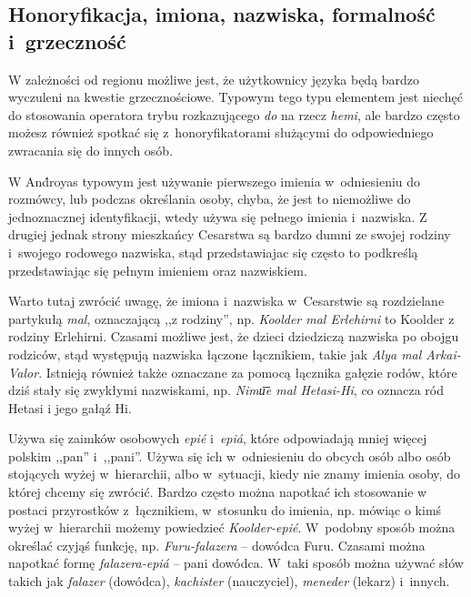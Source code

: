 \begin{spacing}{1.1}
\subsection{Honoryfikacja, imiona, nazwiska, formalność i~grzeczność}

W zależności od regionu możliwe jest, że użytkownicy języka będą bardzo
wyczuleni na kwestie grzecznościowe. Typowym tego typu elementem jest niechęć do
stosowania operatora trybu rozkazującego \emph{do} na rzecz \emph{hemi}, ale
bardzo często możesz również spotkać się z~honoryfikatorami służącymi do
odpowiedniego zwracania się do innych osób.

W And́royas typowym jest używanie pierwszego imienia w~odniesieniu do rozmówcy,
lub podczas określania osoby, chyba, że jest to niemożliwe do jednoznacznej
identyfikacji, wtedy używa się pełnego imienia i~nazwiska. Z drugiej jednak
strony mieszkańcy Cesarstwa są bardzo dumni ze swojej rodziny i~swojego rodowego
nazwiska, stąd przedstawiajac się często to podkreślą przedstawiając się pełnym
imieniem oraz nazwiskiem.


Warto tutaj zwrócić uwagę, że imiona i~nazwiska w~Cesarstwie są rozdzielane
partykułą \emph{mal}, oznaczającą ,,z rodziny'', np. \emph{Koolder mal
Erlehirni} to Koolder z rodziny Erlehirni. Czasami możliwe jest, że dzieci
dziedziczą nazwiska po obojgu rodziców, stąd występują nazwiska łączone
łącznikiem, takie jak \emph{Alya mal Arkai-Valor}. Istnieją również także
oznaczane za pomocą łącznika gałęzie rodów, które dziś stały się zwykłymi
nazwiskami, np. \emph{Nimu͞e mal Hetasi-Hi}, co oznacza ród Hetasi i jego gałąź
Hi.

\skipline

Używa się zaimków osobowych \emph{epié} i~\emph{epiá}, które odpowiadają mniej
więcej polskim ,,pan'' i~,,pani''. Używa się ich w~odniesieniu do obcych osób
albo osób stojących wyżej w~hierarchii, albo w~sytuacji, kiedy nie znamy imienia
osoby, do której chcemy się zwrócić. Bardzo często można napotkać ich stosowanie
w postaci przyrostków z~łącznikiem, w~stosunku do imienia, np. mówiąc o kimś
wyżej w~hierarchii możemy powiedzieć \emph{Koolder-epié}. W~podobny sposób
można określać czyjąś funkcję, np. \emph{Furu-falazera} -- dowódca Furu. Czasami
można napotkać formę \emph{falazera-epiá} -- pani dowódca. W~taki sposób można
używać słów takich jak \emph{falazer} (dowódca), \emph{kachister} (nauczyciel),
\emph{meneder} (lekarz) i~innych.


\end{spacing}
